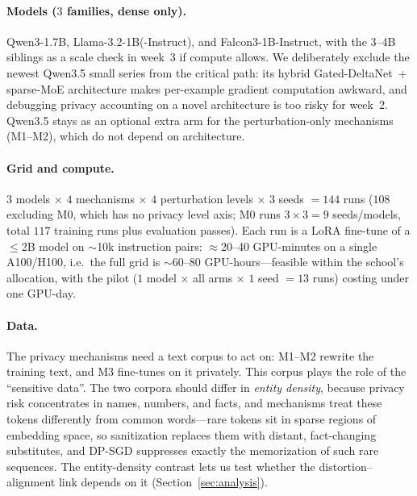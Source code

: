 \documentclass{article}
\theoremstyle{definition}
\theoremstyle{plain}
\theoremstyle{remark}
\newcommand{\secref}[1]{Section~\ref{sec:#1}}
\begin{document}
\paragraph{Models ($3$ families, dense only).}
Qwen3-1.7B, Llama-3.2-1B(-Instruct), and Falcon3-1B-Instruct, with the 3--4B siblings as
a scale check in week~3 if compute allows. We deliberately exclude the newest
Qwen3.5 small series from the critical path: its hybrid Gated-DeltaNet~+
sparse-MoE architecture makes per-example gradient computation awkward, and
debugging privacy accounting on a novel architecture is too risky for
week~2. Qwen3.5 stays as an optional extra arm for the
perturbation-only mechanisms (M1--M2), which do not depend on architecture.

\paragraph{Grid and compute.}
$3$ models $\times$ $4$ mechanisms $\times$ $4$ perturbation levels $\times$ $3$ seeds
$= 144$ runs ($108$ excluding M0, which has no privacy level axis; M0 runs
$3\times3=9$ seeds/models, total $117$ training runs plus evaluation passes).
Each run is a LoRA fine-tune of a $\le$2B model on $\sim$10k instruction
pairs: $\approx$20--40 GPU-minutes on a single A100/H100, i.e.\ the full grid
is $\sim$60--80 GPU-hours---feasible within the school's allocation, with the
pilot ($1$ model $\times$ all arms $\times$ $1$ seed $=13$ runs) costing under
one GPU-day.

\paragraph{Data.}
The privacy mechanisms need a text corpus to act on: M1--M2 rewrite the
training text, and M3 fine-tunes on it privately. This corpus plays the role
of the ``sensitive data''. The two corpora should differ in \emph{entity
density}, because privacy risk concentrates in names, numbers, and facts, and
mechanisms treat these tokens differently from common words---rare tokens sit
in sparse regions of embedding space, so sanitization replaces them with
distant, fact-changing substitutes, and DP-SGD suppresses exactly the
memorization of such rare sequences. The entity-density contrast lets us test
whether the distortion--alignment link depends on it (\secref{analysis}).
\end{document}
